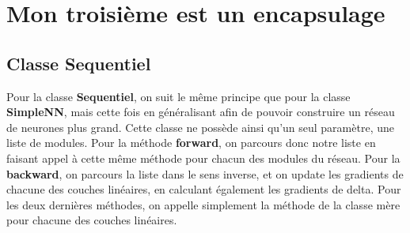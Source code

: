 \documentclass{article}
\begin{document}
\section{Mon troisième est un encapsulage}
\subsection{Classe Sequentiel}
Pour la classe \textbf{Sequentiel}, on suit le même principe que pour la classe \textbf{SimpleNN}, mais cette fois en généralisant afin de pouvoir construire un réseau de neurones plus grand. Cette classe ne possède ainsi qu'un seul paramètre, une liste de modules. Pour la méthode \textbf{forward}, on parcours donc notre liste en faisant appel à cette même méthode pour chacun des modules du réseau. Pour la \textbf{backward}, on parcours la liste dans le sens inverse, et on update les gradients de chacune des couches linéaires, en calculant également les gradients de delta. Pour les deux dernières méthodes, on appelle simplement la méthode de la classe mère pour chacune des couches linéaires.
\end{document}
